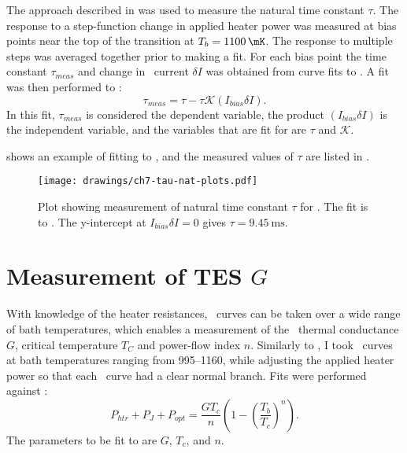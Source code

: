 
The approach described in  was used to measure the natural time constant $\tau$.
The response to a step-function change in applied heater power was measured at bias points near the top of the transition at $T_{b} = \SI{1100}{\mK}$.
The response to multiple steps was averaged together prior to making a fit.
For each bias point the time constant $\tau_{meas}$ and change in \TES\ current $\delta I$ was obtained from curve fits to .
A fit was then performed to :
\begin{equation} \label{eqn:tau-nat-fit}
  \tau_{meas} = \tau - \tau \mathcal{K} (I_{bias} \delta I).
\end{equation}
In this fit, $\tau_{meas}$ is considered the dependent variable, the product $(I_{bias} \delta I)$ is the independent variable, and the variables that are fit for are $\tau$ and $\mathcal{K}$.

 shows an example of fitting to , and the measured values of $\tau$ are listed in .

\begin{figure*}
  \centering
\texttt{[image: drawings/ch7-tau-nat-plots.pdf]}
\caption[Plot showing measurement of natural time constant $\tau$]{
  Plot showing measurement of natural time constant $\tau$ for . The fit is to .
  The y-intercept at $I_{bias} \delta I = 0$ gives $\tau = \SI{9.45}{\ms}$.
} 
\label{fig:tau-nat-plots}
\end{figure*}

\section{Measurement of \textsc{TES} $G$} \label{sec:g-psat}

With knowledge of the heater resistances, \IV\ curves can be taken over a wide range of bath temperatures, which enables a measurement of the \TES\ thermal conductance $G$, critical temperature $T_C$ and power-flow index $n$.
Similarly to , I took \IV\ curves at bath temperatures ranging from \SIrange{995}{1160}{\mK}, while adjusting the applied heater power so that each \IV\ curve had a clear normal branch.
Fits were performed against :
\begin{equation}\label{eqn:g-fit}
P_{htr} + P_J + P_{opt}= \frac{G T_c}{n}\left(1 - \left(\frac{T_b}{T_c}\right)^n\right).
\end{equation}
The parameters to be fit to are $G$, $T_c$, and $n$.

